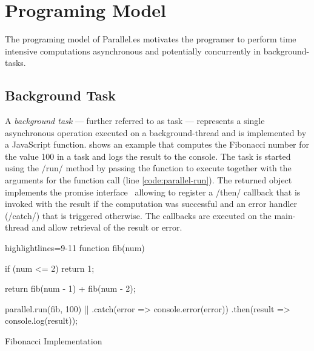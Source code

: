 \section{Programing Model}\label{sec:programing-model}
The programing model of Parallel.es motivates the programer to perform time intensive computations asynchronous and potentially concurrently in background-tasks. 

\subsection{Background Task}
A \textit{background task} --- further referred to as task --- represents a single asynchronous operation executed on a background-thread and is implemented by a JavaScript function.  shows an example that computes the Fibonacci number for the value 100 in a task and logs the result to the console. The task is started using the \javascriptinline/run/ method by passing the function to execute together with the arguments for the function call (line \ref{code:parallel-run}). The returned object implements the promise interface~\cite[Section 18.3.18]{ecmaScript2015} allowing to register a \javascriptinline/then/ callback that is invoked with the result if the computation was successful and an error handler (\javascriptinline/catch/) that is triggered otherwise. The callbacks are executed on the main-thread and allow retrieval of the result or error. 


\begin{listing}
	\begin{javascriptcode*}{highlightlines={9-11}}
function fib(num) {
	if (num <= 2) {
    	return 1;
	}

	return fib(num - 1) + fib(num - 2);
}
        
parallel.run(fib, 100) |$\label{code:parallel-run}$|
	.catch(error => console.error(error))
	.then(result => console.log(result));	
	\end{javascriptcode*}

	\caption{Fibonacci Implementation}
	\label{fig:fibonacci-implementation}
\end{listing}

